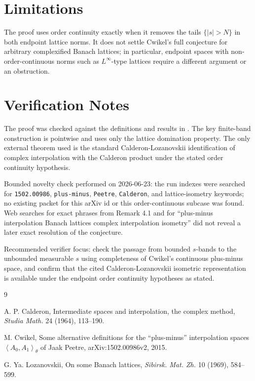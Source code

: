 \documentclass[11pt]{article}
\begin{document}
\section*{Limitations}

The proof uses order continuity exactly when it removes the tails
$\{|s|>N\}$ in both endpoint lattice norms.  It does not settle Cwikel's
full conjecture for arbitrary complexified Banach lattices; in
particular, endpoint spaces with non-order-continuous norms such as
$L^\infty$-type lattices require a different argument or an obstruction.

\section*{Verification Notes}

The proof was checked against the definitions and results in
\cite{Cwikel2015}.  The key finite-band construction is pointwise and
uses only the lattice domination property.  The only external theorem
used is the standard Calderon-Lozanovskii identification of complex
interpolation with the Calderon product under the stated order
continuity hypothesis.

Bounded novelty check performed on 2026-06-23: the run indexes were
searched for \texttt{1502.00986}, \texttt{plus-minus},
\texttt{Peetre}, \texttt{Calderon}, and lattice-isometry keywords; no
existing packet for this arXiv id or this order-continuous subcase was
found.  Web searches for exact phrases from Remark 4.1 and for
``plus-minus interpolation Banach lattices complex interpolation
isometry'' did not reveal a later exact resolution of the conjecture.

Recommended verifier focus: check the passage from bounded $s$-bands to
the unbounded measurable $s$ using completeness of Cwikel's continuous
plus-minus space, and confirm that the cited Calderon-Lozanovskii
isometric representation is available under the endpoint order
continuity hypotheses as stated.

\begin{thebibliography}{9}

A. P. Calderon,
Intermediate spaces and interpolation, the complex method,
\emph{Studia Math.} 24 (1964), 113--190.

M. Cwikel,
Some alternative definitions for the ``plus-minus'' interpolation spaces
$\left\langle A_0,A_1\right\rangle_\theta$ of Jaak Peetre,
arXiv:1502.00986v2, 2015.

G. Ya. Lozanovskii,
On some Banach lattices,
\emph{Sibirsk. Mat. Zh.} 10 (1969), 584--599.

\end{thebibliography}
\end{document}
